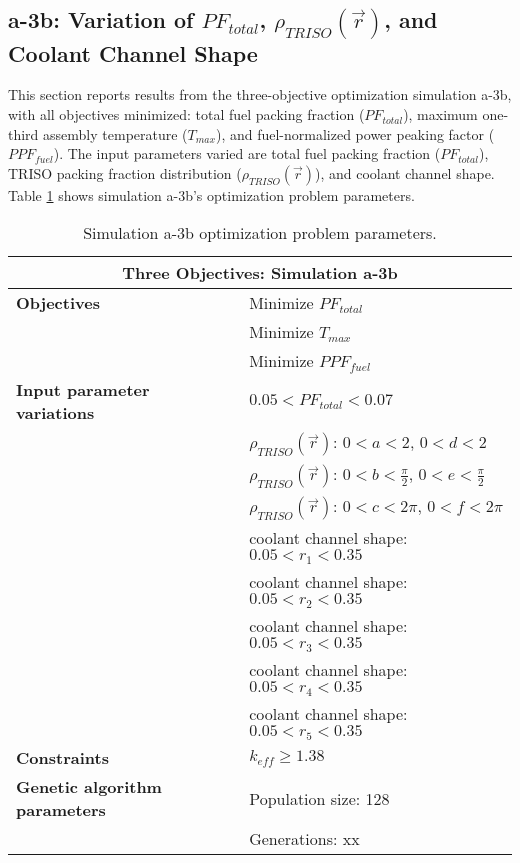 \subsection{a-3b: Variation of $PF_{total}$, $\rho_{TRISO}(\vec{r})$, and Coolant 
Channel Shape}
\label{sec:a-3b}
This section reports results from the three-objective optimization simulation a-3b, 
with all objectives minimized: total fuel packing fraction ($PF_{total}$), maximum 
one-third assembly temperature ($T_{max}$), and fuel-normalized power peaking factor 
($PPF_{fuel}$).  
The input parameters varied are total fuel packing fraction ($PF_{total}$), 
TRISO packing fraction distribution ($\rho_{TRISO}(\vec{r})$), and coolant channel 
shape.  
Table \ref{tab:simulationa3b} shows simulation a-3b's optimization problem parameters. 
\begin{table}[htbp!]
    \centering
    \onehalfspacing
    \caption{Simulation a-3b optimization problem parameters.}
	\label{tab:simulationa3b}
    \footnotesize
    \begin{tabular}{l|p{6.5cm}}
    \hline 
    \multicolumn{2}{c}{\textbf{Three Objectives: Simulation a-3b}} \\
    \hline 
    \textbf{Objectives} & Minimize $PF_{total}$ \\
    & Minimize $T_{max}$ \\
    & Minimize $PPF_{fuel}$ \\
    \hline 
    \textbf{Input parameter variations} & $0.05<PF_{total}<0.07$ \\
    & $\rho_{TRISO}(\vec{r})$: $0<a<2$, $0<d<2$\\
    & $\rho_{TRISO}(\vec{r})$: $0<b<\frac{\pi}{2}$, $0<e<\frac{\pi}{2}$\\
    & $\rho_{TRISO}(\vec{r})$: $0<c<2\pi$, $0<f<2\pi$\\
    & coolant channel shape: $0.05<r_{1}<0.35$ \\
    & coolant channel shape: $0.05<r_{2}<0.35$ \\
    & coolant channel shape: $0.05<r_{3}<0.35$ \\
    & coolant channel shape: $0.05<r_{4}<0.35$ \\
    & coolant channel shape: $0.05<r_{5}<0.35$ \\
    \hline
    \textbf{Constraints} & $k_{eff} \geq 1.38$\\ 
    \hline 
    \textbf{Genetic algorithm parameters} & Population size: 128 \\
    & Generations: xx \\
    \hline
    \end{tabular}
\end{table}

